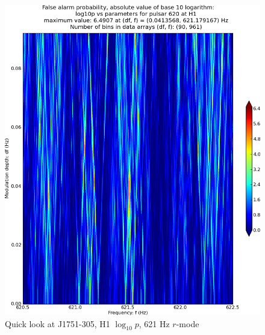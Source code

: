 \begin{figure}
\begin{center}
\includegraphics[width=0.5\paperwidth,height=0.35\paperheight]{plots/DFvsFresultsProb-H1_pulsar-620.eps}
\caption{
Quick look at J1751-305, H1 $\log_{10}p$, 621 Hz $r$-mode}
\end{center}
\end{figure}


